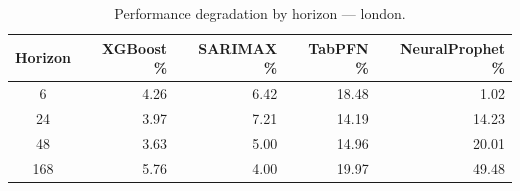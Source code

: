 \begin{table}[h]
\centering
\caption{Performance degradation by horizon — london.}
\label{tab:degradation_horizon_london}
\begin{tabular}{crrrr}
\toprule
Horizon & XGBoost \% & SARIMAX \% & TabPFN \% & NeuralProphet \% \\
\midrule
6 & 4.26 & 6.42 & 18.48 & 1.02 \\
24 & 3.97 & 7.21 & 14.19 & 14.23 \\
48 & 3.63 & 5.00 & 14.96 & 20.01 \\
168 & 5.76 & 4.00 & 19.97 & 49.48 \\
\bottomrule
\end{tabular}
\end{table}
